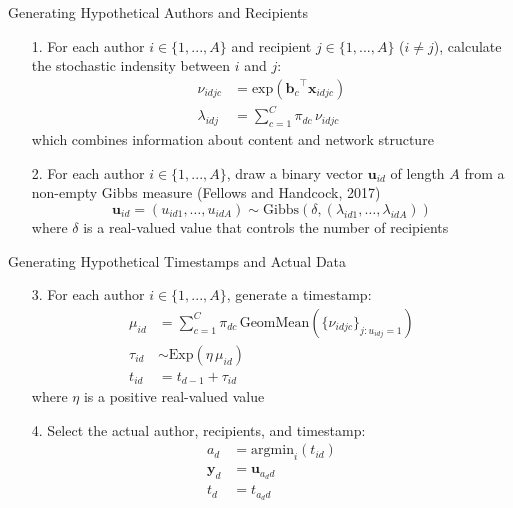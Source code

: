 \documentclass[10pt, xcolor=table]{beamer}
\theoremstyle{definition}
\theoremstyle{remark}
\begin{document}
\begin{frame}{Generating Hypothetical Authors and Recipients}
		\begin{itemize}
		\item [1.] For each author $i \in \{1,...,A\}$ and recipient $j \in \{1,...,A\}$ ($i \neq j$), calculate the stochastic indensity between $i$ and $j$:
			\begin{align*}\nu_{idjc} &= \mbox{exp}({\boldsymbol{b}_c}^{\top}\boldsymbol{x}_{idjc})\\
                          \lambda_{idj} &=\sum_{c=1}^{C} \pi_{dc}\, \nu_{idjc}
			\end{align*}\normalsize
		which combines information about content and network structure\\ \vspace{0.4cm}
		\item[2.] For each author $i \in \{1,...,A\}$, draw a
                  binary vector $\boldsymbol{u}_{id}$ of length $A$
                  from a non-empty Gibbs measure (Fellows and Handcock, 2017)
		\begin{equation*} \boldsymbol{u}_{id} = (u_{id1},
                  \ldots, u_{idA}) \sim
                  \mbox{Gibbs}(\delta, (\lambda_{id1}, \ldots, \lambda_{idA}))
		\end{equation*}
		\normalsize
		where $\delta$ is a real-valued value that controls
                the number of recipients\\\vspace{0.1cm}
	\end{itemize}
	\end{frame}
\begin{frame}{Generating Hypothetical Timestamps and Actual Data}
\begin{itemize}
		\item [3.] For each author $i \in \{1,...,A\}$,
                  generate a timestamp:
		\begin{align*}
                  \mu_{id} &= \sum_{c=1}^C \pi_{dc}\, \mbox{GeomMean}(\{
                  \nu_{idjc} \}_{j:u_{idj}= 1})\\
		\tau_{id} &\sim \mbox{Exp}(\eta\,\mu_{id})\\
                t_{id} &= t_{d-1} + \tau_{id}
		\end{align*}\normalsize
		where $\eta$ is a positive real-valued value \vspace{0.4cm}
		\item[4.] Select the actual author, recipients, and timestamp:
			\begin{align*}
		a_d &= \mbox{argmin}_{i}(t_{id})\\
		\boldsymbol{y}_d &= \boldsymbol{u}_{a_d d}\\
		t_d &= t_{a_d d}
		\end{align*}
		\normalsize
\end{itemize}
\end{frame}
\end{document}
